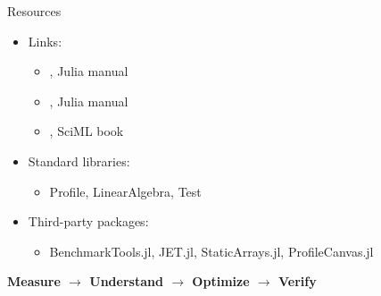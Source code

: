 \begin{frame}{Resources}
    \begin{itemize}
        \item Links:
              \begin{itemize}
                  \item \href{https://docs.julialang.org/en/v1/manual/profile/}{}, Julia manual
                  \item \href{https://docs.julialang.org/en/v1/manual/performance-tips/}{}, Julia manual
                  \item \href{https://book.sciml.ai/notes/18-Code_Profiling_and_Optimization/}{}, SciML book
              \end{itemize}

        \item Standard libraries:
              \begin{itemize}
                  \item Profile, LinearAlgebra, Test
              \end{itemize}

        \item Third-party packages:
              \begin{itemize}
                  \item BenchmarkTools.jl, JET.jl, StaticArrays.jl, ProfileCanvas.jl
              \end{itemize}
    \end{itemize}

    \bigskip

    \centering
    \alert{\textbf{Measure \( \to \) Understand \( \to \) Optimize \( \to \) Verify}}
\end{frame}
